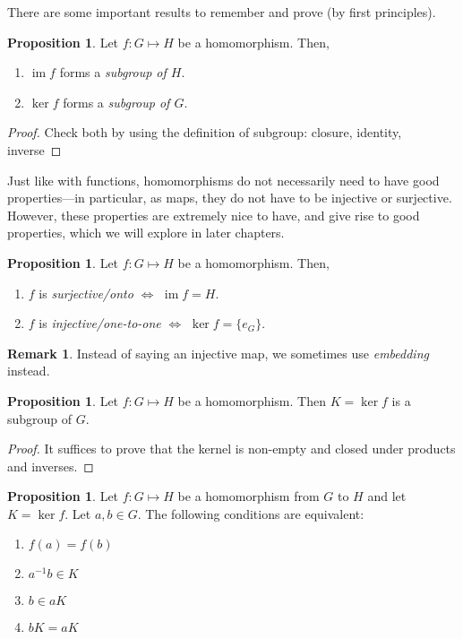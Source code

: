 \documentclass[11pt]{amsart} %
\theoremstyle{definition}
\newtheorem{proposition}[definition]{Proposition}
\theoremstyle{definition}
\newtheorem{remark}[definition]{Remark}
\DeclareMathOperator{\im}{im}
\numberwithin{equation}{section}
\begin{document}
There are some important results to remember and prove (by first principles).

\begin{proposition}
	Let $f: G \mapsto H$ be a homomorphism. Then,
	\begin{enumerate}[noitemsep]
		\item $\im f$ forms a \textit{subgroup of $H$}.
		\item $\ker f$ forms a \textit{subgroup of $G$}.		
	\end{enumerate}
\end{proposition}

\begin{proof}
	Check both by using the definition of subgroup: closure, identity, inverse
\end{proof}

Just like with functions, homomorphisms do not necessarily need to have good properties---in particular, as maps, they do not have to be injective or surjective. However, these properties are extremely nice to have, and give rise to good properties, which we will explore in later chapters. 

\begin{proposition}
	Let $f: G \mapsto H$ be a homomorphism. Then,
	\begin{enumerate}[noitemsep]
		\item $f$ is \textit{surjective/onto} $\iff$ $\im f =H$.
		\item $f$ is \textit{injective/one-to-one} $\iff$ $\ker f =\{e_G\}$.
	\end{enumerate}
\end{proposition}

\begin{remark}
	Instead of saying an injective map, we sometimes use \textit{embedding} instead.
\end{remark}


\begin{proposition}
	Let $f: G \mapsto H$ be a homomorphism. Then $K = \ker f$ is a subgroup of $G$.
\end{proposition}

\begin{proof}
	It suffices to prove that the kernel is non-empty and closed under products and inverses.
\end{proof}


\begin{proposition}
	Let $f: G \mapsto H$ be a homomorphism from $G$ to $H$ and let $K = \ker f$. Let $a,b \in G$. The following conditions are equivalent:
	\begin{enumerate}[noitemsep]
		\item \label{1} $f(a) = f(b)$
		\item \label{2} $a^{-1} b \in K$
		\item \label{3} $b \in aK$
		\item \label{4} $bK = aK$
	\end{enumerate}
\end{proposition}
\end{document}
